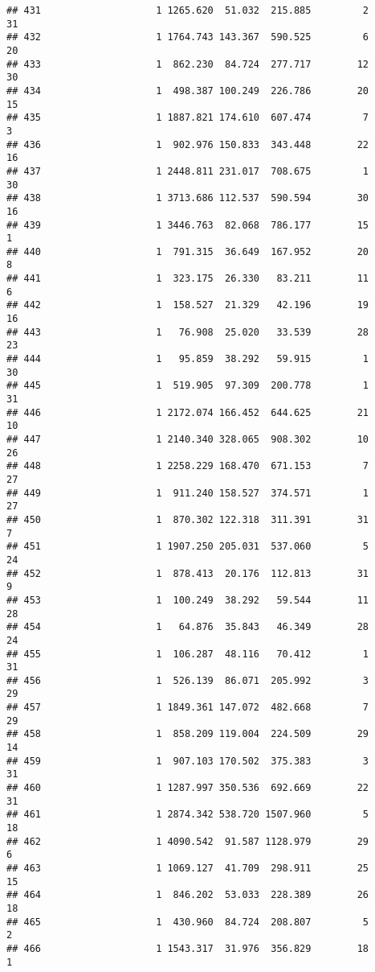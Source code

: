 \documentclass[
]{article}
\begin{document}
\begin{verbatim}
## 431                    1 1265.620  51.032  215.885         2        31
## 432                    1 1764.743 143.367  590.525         6        20
## 433                    1  862.230  84.724  277.717        12        30
## 434                    1  498.387 100.249  226.786        20        15
## 435                    1 1887.821 174.610  607.474         7         3
## 436                    1  902.976 150.833  343.448        22        16
## 437                    1 2448.811 231.017  708.675         1        30
## 438                    1 3713.686 112.537  590.594        30        16
## 439                    1 3446.763  82.068  786.177        15         1
## 440                    1  791.315  36.649  167.952        20         8
## 441                    1  323.175  26.330   83.211        11         6
## 442                    1  158.527  21.329   42.196        19        16
## 443                    1   76.908  25.020   33.539        28        23
## 444                    1   95.859  38.292   59.915         1        30
## 445                    1  519.905  97.309  200.778         1        31
## 446                    1 2172.074 166.452  644.625        21        10
## 447                    1 2140.340 328.065  908.302        10        26
## 448                    1 2258.229 168.470  671.153         7        27
## 449                    1  911.240 158.527  374.571         1        27
## 450                    1  870.302 122.318  311.391        31         7
## 451                    1 1907.250 205.031  537.060         5        24
## 452                    1  878.413  20.176  112.813        31         9
## 453                    1  100.249  38.292   59.544        11        28
## 454                    1   64.876  35.843   46.349        28        24
## 455                    1  106.287  48.116   70.412         1        31
## 456                    1  526.139  86.071  205.992         3        29
## 457                    1 1849.361 147.072  482.668         7        29
## 458                    1  858.209 119.004  224.509        29        14
## 459                    1  907.103 170.502  375.383         3        31
## 460                    1 1287.997 350.536  692.669        22        31
## 461                    1 2874.342 538.720 1507.960         5        18
## 462                    1 4090.542  91.587 1128.979        29         6
## 463                    1 1069.127  41.709  298.911        25        15
## 464                    1  846.202  53.033  228.389        26        18
## 465                    1  430.960  84.724  208.807         5         2
## 466                    1 1543.317  31.976  356.829        18         1

\end{verbatim}
\end{document}
